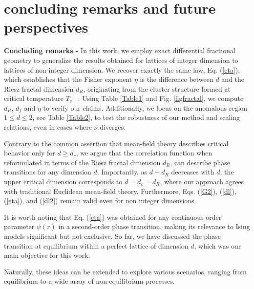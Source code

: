 \documentclass[pre,aps,twocolumn,showpacs,floatfix,nofootinbib,superscriptaddress,linenumbers]{revtex4-1}
\begin{document}
\section{concluding remarks and future perspectives}

 {\bf Concluding remarks -} %
In this work, we employ exact differential fractional geometry to generalize the results obtained for lattices of integer dimension to lattices of non-integer dimension. We recover exactly the same law,  Eq. (\ref{eta}), which establishes that the Fisher exponent $\eta$ is the difference between $d$ and the Riesz fractal dimension $d_R$,  originating from the cluster structure formed at critical temperature $T_c$ ~\cite{Lima24}. Using Table \ref{Table1} and Fig. \ref{figfractal}, we compute  $d_R$,  $d_f$ and $\eta$ to verify our claims.  Additionally, we focus on the anomalous region $1 \leq d \leq 2$, see Table \ref{Table2}, to test the robustness of our method and scaling relations, even in cases where $\nu$ diverges. 

Contrary to the common assertion that mean-field theory describes critical behavior only for $d\geq d_c$, we argue that the correlation function when reformulated in terms of the Riesz fractal dimension $d_R$, can describe phase transitions for any dimension $d$. Importantly, as $d-d_R$ decreases with $d$, the upper critical dimension corresponds to $d=d_c=d_R$, where our approach agrees with traditional Euclidean mean-field theory. Furthermore, Eqs. (\ref{G2}), (\ref{dl}), (\ref{eta}), and (\ref{dl2}) remain valid even for non integer dimensions. 

It is worth noting that Eq. (\ref{eta}) was obtained for any continuous order parameter $\psi(r)$ in a second-order phase transition, making its relevance to Ising models significant but not exclusive. So far, we have discussed the phase transition at equilibrium within a perfect lattice of dimension $d$, which was our main objective for this work.

Naturally, these ideas can be extended to explore various scenarios, ranging from equilibrium to a wide array of non-equilibrium processes. 
\end{document}
